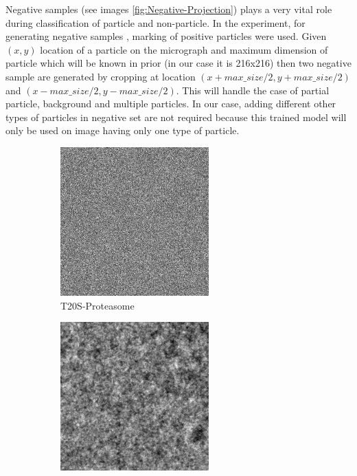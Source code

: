 \documentclass{report}
\begin{document}
Negative samples (see images \ref{fig:Negative-Projection}) plays a very vital role during classification  of particle and non-particle. In the experiment, for generating negative samples \cite{chen2012detection}, marking of positive particles were used. Given $(x,y)$ location of a particle on the micrograph and maximum dimension of particle  which will be known in prior (in our case it is 216x216) then two negative sample are generated by cropping at location $(x+ max\_size/2, y + max\_size/2)$ and $(x- max\_size/2, y - max\_size/2)$. This will handle the case of partial particle, background and multiple particles. In our case, adding different other types of particles in negative set are not required because this trained model will only be used on image having only one type of particle. 

\begin{figure}[h]
\centering
\begin{subfigure}{.5\textwidth}
\centering
\includegraphics[width=0.5\linewidth]{neg-EM-10025.png}
\captionsetup{justification=centering}
\caption{ T20S-Proteasome }
\end{subfigure} 
\begin{subfigure}{.48\textwidth}
\centering
\includegraphics[width=0.5\linewidth]{neg-EM-10028.png}

\end{subfigure}
\end{figure}
\end{document}
